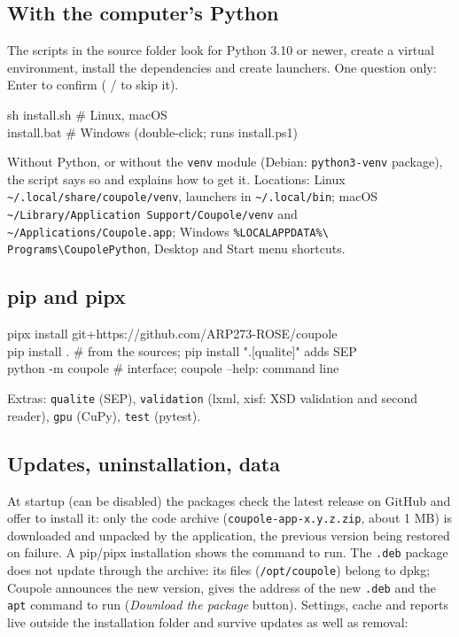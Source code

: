 \subsection{With the computer's Python}
The scripts in the source folder look for Python 3.10 or newer, create a virtual environment, install the
dependencies and create launchers. One question only: Enter to confirm ( /  to skip it).
\begin{ccode}
sh install.sh                \# Linux, macOS\\
install.bat                  \# Windows (double-click; runs install.ps1)
\end{ccode}
Without Python, or without the \texttt{venv} module (Debian: \texttt{python3-venv} package), the script says so and
explains how to get it. Locations: Linux \texttt{\textasciitilde/.local/share/coupole/venv}, launchers in
\texttt{\textasciitilde/.local/bin}; macOS \texttt{\textasciitilde/Library/Application Support/Coupole/venv} and
\texttt{\textasciitilde/Applications/Coupole.app}; Windows \texttt{\%LOCALAPPDATA\%\textbackslash
Programs\textbackslash CoupolePython}, Desktop and Start menu shortcuts.

\subsection{pip and pipx}
\begin{ccode}
pipx install git+https://github.com/ARP273-ROSE/coupole\\
pip install .                 \# from the sources; pip install ".[qualite]" adds SEP\\
python -m coupole             \# interface; coupole --help: command line
\end{ccode}
Extras: \texttt{qualite} (SEP), \texttt{validation} (lxml, xisf: XSD validation and second reader), \texttt{gpu}
(CuPy), \texttt{test} (pytest).

\subsection{Updates, uninstallation, data}\label{sec:donnees}
At startup (can be disabled) the packages check the latest release on GitHub and offer to install it: only the
code archive (\texttt{coupole-app-x.y.z.zip}, about 1 MB) is downloaded and unpacked by the application, the
previous version being restored on failure. A pip/pipx installation shows the command to run. The \texttt{.deb}
package does not update through the archive: its files (\texttt{/opt/coupole}) belong to dpkg; Coupole announces the
new version, gives the address of the new \texttt{.deb} and the \texttt{apt} command to run (\emph{Download the
package} button). Settings, cache and reports live outside the installation folder and survive updates as well as
removal:

